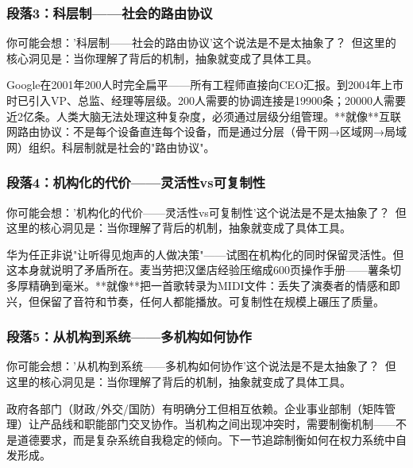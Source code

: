 \documentclass[a4paper,12pt]{book}
\newenvironment{motivation}{\begin{tcolorbox}[colback=gray!10,colframe=gray!60,title=\textit{本章动机},fonttitle=\bfseries,arc=0mm,leftrule=3mm]\small\itshape}{\end{tcolorbox}}
\begin{document}
\begin{motivation}
\begin{motivation}
\begin{motivation}
	\subsubsection*{段落3：科层制——社会的路由协议}

	\begin{tcolorbox}[colback=yellow!5, title=\textit{读者行为预测}]
		你可能会想：'科层制——社会的路由协议'这个说法是不是太抽象了？\ 但这里的核心洞见是：当你理解了背后的机制，抽象就变成了具体工具。
	\end{tcolorbox}

Google在2001年200人时完全扁平——所有工程师直接向CEO汇报。到2004年上市时已引入VP、总监、经理等层级。200人需要的协调连接是19900条；20000人需要近2亿条。人类大脑无法处理这种复杂度，必须通过层级分组管理。**就像**互联网路由协议：不是每个设备直连每个设备，而是通过分层（骨干网→区域网→局域网）组织。科层制就是社会的"路由协议"。

	\subsubsection*{段落4：机构化的代价——灵活性vs可复制性}

	\begin{tcolorbox}[colback=yellow!5, title=\textit{读者行为预测}]
		你可能会想：'机构化的代价——灵活性vs可复制性'这个说法是不是太抽象了？\ 但这里的核心洞见是：当你理解了背后的机制，抽象就变成了具体工具。
	\end{tcolorbox}

华为任正非说"让听得见炮声的人做决策"——试图在机构化的同时保留灵活性。但这本身就说明了矛盾所在。麦当劳把汉堡店经验压缩成600页操作手册——薯条切多厚精确到毫米。**就像**把一首歌转录为MIDI文件：丢失了演奏者的情感和即兴，但保留了音符和节奏，任何人都能播放。可复制性在规模上碾压了质量。

	\subsubsection*{段落5：从机构到系统——多机构如何协作}

	\begin{tcolorbox}[colback=yellow!5, title=\textit{读者行为预测}]
		你可能会想：'从机构到系统——多机构如何协作'这个说法是不是太抽象了？\ 但这里的核心洞见是：当你理解了背后的机制，抽象就变成了具体工具。
	\end{tcolorbox}

政府各部门（财政/外交/国防）有明确分工但相互依赖。企业事业部制（矩阵管理）让产品线和职能部门交叉协作。当机构之间出现冲突时，需要制衡机制——不是道德要求，而是复杂系统自我稳定的倾向。下一节追踪制衡如何在权力系统中自发形成。


\end{motivation}
\end{motivation}
\end{motivation}
\end{document}
